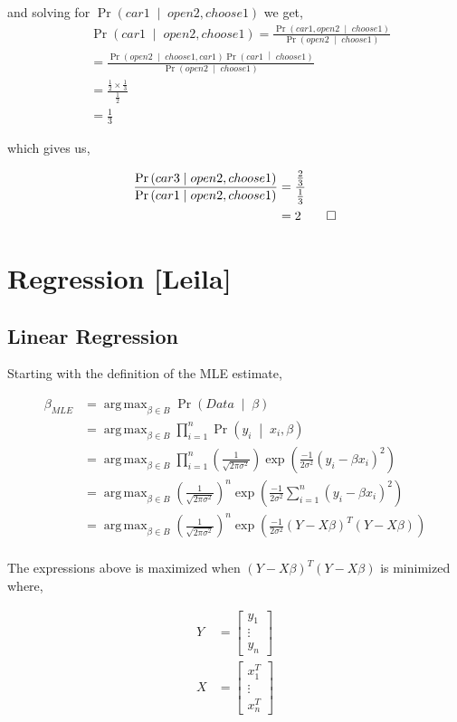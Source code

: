 \documentclass[letterpaper,10pt]{article} %
\newcommand{\pipe}{\;\middle\vert\;}
\newcommand{\condp}[2]{\Pr\left( #1 \pipe #2 \right)}
\newcommand{\pr}[1]{\Pr\left( #1 \right)}
\DeclareMathOperator*{\argmax}{arg\,max}
\newcommand{\prove}[1]{
\begin{Proof}
\begin{align*}
#1
\end{align*}
\end{Proof}
}
\begin{document}
and solving for $\pr{car1 \pipe open2, choose1}$ we get,
\begin{align*}
 &\pr{car1 \pipe open2, choose1} = \frac{\condp{car1, open2}{choose1}}{\condp{open2}{choose1}}\\
 &=\frac{\condp{open2}{choose1,car1}\condp{car1}{choose1}}{\condp{open2}{choose1}} \\
 &=\frac{\tfrac{1}{2} \times \tfrac{1}{3}}{\tfrac{1}{2}} \\
 &=\tfrac{1}{3}
\end{align*}

which gives us,

\prove{
  \frac{\pr{car3 \pipe open2, choose1}}{\pr{car1 \pipe open2, choose1}} &= \frac{\tfrac{2}{3}}{\tfrac{1}{3}} \\
  &= 2 \qedhere
}

\newpage
\section{Regression [Leila]}
\subsection{Linear Regression}
Starting with the definition of the MLE estimate,

\begin{align*}
\beta_{MLE} &= \argmax_{\beta \in B} \condp{Data}{\beta}\\
&= \argmax_{\beta \in B} \prod_{i=1}^n \condp{y_i}{x_i, \beta}\\
&= \argmax_{\beta \in B} \prod_{i=1}^n \left(\frac{1}{\sqrt{2\pi\sigma^2}}\right) \exp\left( \frac{-1}{2\sigma^2} (y_i-\beta x_i)^2 \right) \\
&= \argmax_{\beta \in B} \left(\frac{1}{\sqrt{2\pi\sigma^2}}\right)^n \exp\left( \frac{-1}{2\sigma^2} \sum_{i=1}^n (y_i-\beta x_i)^2 \right) \\
&= \argmax_{\beta \in B} \left(\frac{1}{\sqrt{2\pi\sigma^2}}\right)^n \exp\left( \frac{-1}{2\sigma^2} (Y-X\beta)^T(Y-X\beta) \right) \\
\end{align*}

The expressions above is maximized when $(Y-X\beta)^T(Y-X\beta)$ is minimized where,

\begin{align*}
Y &= \left[ \begin{array}{c}
y_1 \\
\vdots \\
y_n \end{array} \right] \\
X &= \left[ \begin{array}{c}
x_1^T \\
\vdots \\
x_n^T \end{array} \right]
\end{align*}
\end{document}
